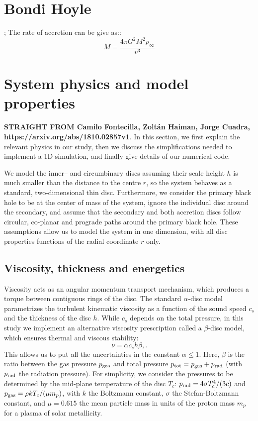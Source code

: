 \documentclass[11pt,a4paper]{article}
\begin{document}
\section{Bondi Hoyle}
\citet{Bondi_Hoyle1944};
The rate of accretion can be give as::
\begin{equation}
\dot{M} = \frac{4 \pi G^2 M^2 \rho_{\infty}}{v^3}
\end{equation}


\section{System physics and model properties} \label{sec:phys}
{\bf STRAIGHT FROM Camilo Fontecilla, Zoltán Haiman, Jorge Cuadra, https://arxiv.org/abs/1810.02857v1}. 
In this section, we first explain the relevant physics in our study,
then we discuss the simplifications needed to implement a 1D
simulation, and finally give details of our numerical code.

We model the inner-- and circumbinary discs assuming their scale
height $h$ is much smaller than the distance to the centre $r$, so the
system behaves as a standard, two-dimensional thin disc. Furthermore,
we consider the primary black hole to be at the center of mass of the
system, ignore the individual disc around the secondary, and assume
that the secondary and both accretion discs follow circular, co-planar
and prograde paths around the primary black hole. These assumptions
allow us to model the system in one dimension, with all disc
properties functions of the radial coordinate $r$ only.

\subsection{Viscosity, thickness and energetics} \label{sec:visc}

Viscosity acts as an angular momentum transport mechanism, which
produces a torque between contiguous rings of the disc. The standard
$\alpha$-disc model \citep{shakura73} parametrizes the turbulent
kinematic viscosity as a function of the sound speed $c_s$ and the
thickness of the disc $h$. While $c_s$ depends on the total pressure,
in this study we implement an alternative viscosity prescription
called a $\beta$-disc model, which ensures thermal and viscous
stability:
%
\begin{equation}
\nu = \alpha c_s h \beta, \label{eq:nu}.
\end{equation}
%
This allows us to put all the uncertainties in the constant $\alpha
\leq 1$. Here, $\beta$ is the ratio between the gas pressure $p_{\rm
gas}$ and total pressure $p_{\rm tot} = p_{\rm gas} + p_{\rm rad}$
(with $p_{\rm rad}$ the radiation pressure). For simplicity, we
consider the pressures to be determined by the mid-plane temperature
of the disc $T_c$: $p_{\rm rad} = 4 \sigma T_c^4 / (3 c)$ and $p_{\rm
gas} = \rho k T_c / (\mu m_p)$, with $k$ the Boltzmann constant,
$\sigma$ the Stefan-Boltzmann constant, and $\mu = 0.615$ the mean
particle mass in units of the proton mass $m_p$ for a plasma of solar
metallicity.
\end{document}
